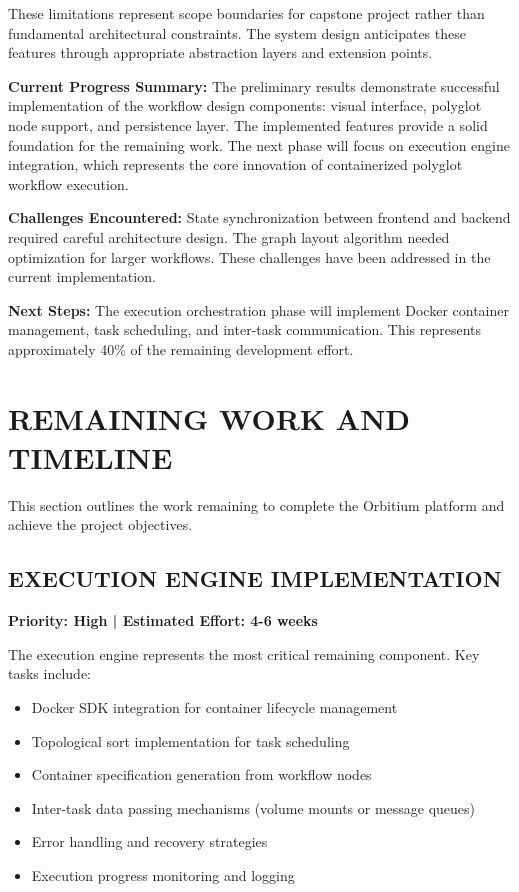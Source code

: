 \documentclass[12pt]{article}
\begin{document}
These limitations represent scope boundaries for capstone project rather than fundamental architectural constraints. The system design anticipates these features through appropriate abstraction layers and extension points.

\hspace{\parindent}\textbf{Current Progress Summary:} The preliminary results demonstrate successful implementation of the workflow design components: visual interface, polyglot node support, and persistence layer. The implemented features provide a solid foundation for the remaining work. The next phase will focus on execution engine integration, which represents the core innovation of containerized polyglot workflow execution.

\hspace{\parindent}\textbf{Challenges Encountered:} State synchronization between frontend and backend required careful architecture design. The graph layout algorithm needed optimization for larger workflows. These challenges have been addressed in the current implementation.

\hspace{\parindent}\textbf{Next Steps:} The execution orchestration phase will implement Docker container management, task scheduling, and inter-task communication. This represents approximately 40\% of the remaining development effort.

\newpage
\section{REMAINING WORK AND TIMELINE}

\hspace{\parindent}This section outlines the work remaining to complete the Orbitium platform and achieve the project objectives.

\subsection{EXECUTION ENGINE IMPLEMENTATION}

\hspace{\parindent}\textbf{Priority: High | Estimated Effort: 4-6 weeks}

The execution engine represents the most critical remaining component. Key tasks include:

\begin{itemize}
    \item Docker SDK integration for container lifecycle management
    \item Topological sort implementation for task scheduling
    \item Container specification generation from workflow nodes
    \item Inter-task data passing mechanisms (volume mounts or message queues)
    \item Error handling and recovery strategies
    \item Execution progress monitoring and logging
\end{itemize}
\end{document}
